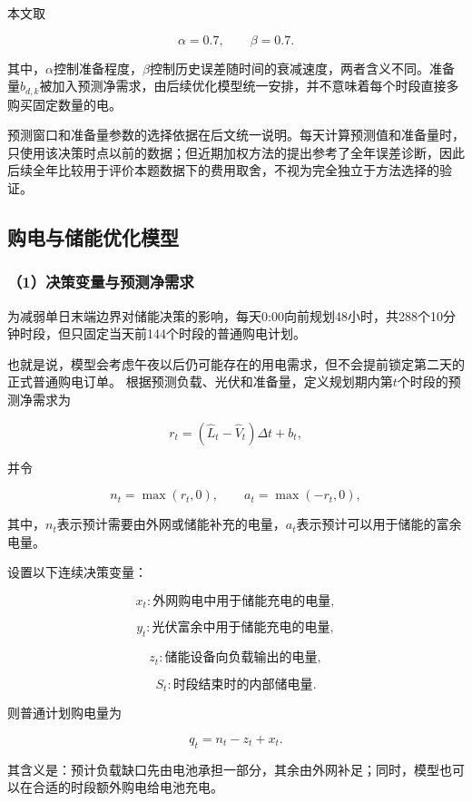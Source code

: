 本文取

\[
\alpha=0.7,\qquad \beta=0.7.
\]

其中，$\alpha$控制准备程度，$\beta$控制历史误差随时间的衰减速度，两者含义不同。准备量$b_{d,k}$被加入预测净需求，由后续优化模型统一安排，并不意味着每个时段直接多购买固定数量的电。

预测窗口和准备量参数的选择依据在后文统一说明。每天计算预测值和准备量时，只使用该决策时点以前的数据；但近期加权方法的提出参考了全年误差诊断，因此后续全年比较用于评价本题数据下的费用取舍，不视为完全独立于方法选择的验证。


\subsection{购电与储能优化模型}

\subsubsection*{（1）决策变量与预测净需求}

为减弱单日末端边界对储能决策的影响，每天0:00向前规划48小时，共288个10分钟时段，但只固定当天前144个时段的普通购电计划。

也就是说，模型会考虑午夜以后仍可能存在的用电需求，但不会提前锁定第二天的正式普通购电订单。
根据预测负载、光伏和准备量，定义规划期内第$t$个时段的预测净需求为

\begin{equation}
r_t
=
(\widehat L_t-\widehat V_t)\Delta t+b_t,
\label{eq:q2_net_demand}
\end{equation}

并令

\[
n_t=\max(r_t,0),
\qquad
a_t=\max(-r_t,0),
\]

其中，$n_t$表示预计需要由外网或储能补充的电量，$a_t$表示预计可以用于储能的富余电量。

设置以下连续决策变量：

\[
x_t:\text{外网购电中用于储能充电的电量},
\]

\[
y_t:\text{光伏富余中用于储能充电的电量},
\]

\[
z_t:\text{储能设备向负载输出的电量},
\]

\[
S_t:\text{时段结束时的内部储电量}.
\]

则普通计划购电量为

\begin{equation}
q_t=n_t-z_t+x_t.
\label{eq:q2_purchase}
\end{equation}

其含义是：预计负载缺口先由电池承担一部分，其余由外网补足；同时，模型也可以在合适的时段额外购电给电池充电。


